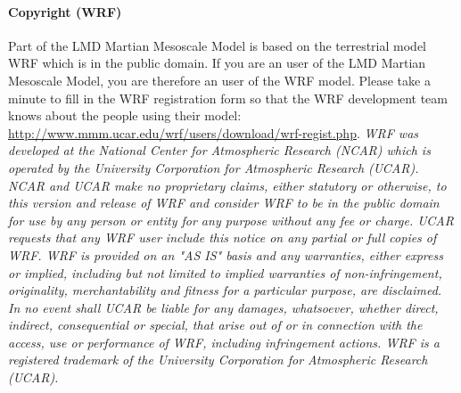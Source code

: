 \paragraph{Copyright (WRF)} Part of the LMD Martian Mesoscale Model is based on the terrestrial model WRF which is in the public domain. If you are an user of the LMD Martian Mesoscale Model, you are therefore an user of the WRF model. Please take a minute to fill in the WRF registration form so that the WRF development team knows about the people using their model: \url{http://www.mmm.ucar.edu/wrf/users/download/wrf-regist.php}. \noindent \scriptsize \emph{WRF was developed at the National Center for Atmospheric Research (NCAR) which is operated by the University Corporation for Atmospheric Research (UCAR). NCAR and UCAR make no proprietary claims, either statutory or otherwise, to this version and release of WRF and consider WRF to be in the public domain for use by any person or entity for any purpose without any fee or charge. UCAR requests that any WRF user include this notice on any partial or full copies of WRF. WRF is provided on an "AS IS" basis and any warranties, either express or implied, including but not limited to implied warranties of non-infringement, originality, merchantability and fitness for a particular purpose, are disclaimed. In no event shall UCAR be liable for any damages, whatsoever, whether direct, indirect, consequential or special, that arise out of or in connection with the access, use or performance of WRF, including infringement actions. WRF is a registered trademark of the University Corporation for Atmospheric Research (UCAR).} \normalsize

\clearemptydoublepage
